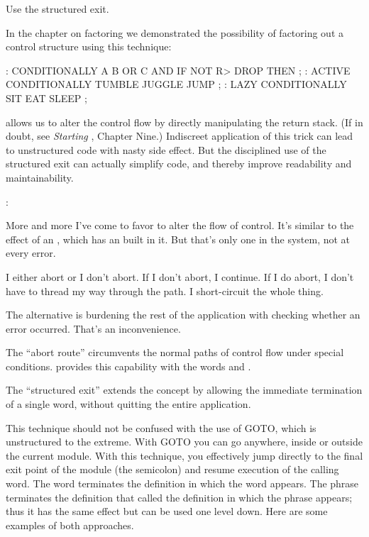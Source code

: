 \begin{tip}
Use the structured exit.
\end{tip}
In the chapter on factoring we demonstrated the possibility of factoring
out a control structure using this technique:

\begin{Code}
: CONDITIONALLY   A B OR  C AND  IF  NOT R> DROP  THEN ;
: ACTIVE   CONDITIONALLY   TUMBLE JUGGLE JUMP ;
: LAZY   CONDITIONALLY  SIT  EAT  SLEEP ;
\end{Code}
\Forth{} allows us to alter the control flow by directly manipulating the
return stack. (If in doubt, see \emph{Starting \Forth{}}, Chapter Nine.)
Indiscreet application of this trick can lead to unstructured code with nasty
side effect. But the disciplined use of the structured exit can actually
simplify code, and thereby improve readability and maintainability.

\begin{interview}
:
\begin{tfquot}
More and more I've come to favor  to alter the flow of
control.  It's similar to the effect of an , which has an
 built in it. But that's only one  in the system, not at every error.

I either abort or I don't abort. If I don't abort, I continue. If I do
abort, I don't have to thread my way through the path. I short-circuit the
whole thing.

The alternative is burdening the rest of the application with checking
whether an error occurred. That's an inconvenience.
\end{tfquot}
\end{interview}
The ``abort route'' circumvents the normal paths of control flow under
special conditions. \Forth{} provides this capability with the words
 and .

The ``structured exit'' extends the concept by allowing the immediate
termination of a single word, without quitting the entire application.

This technique should not be confused with the use of GOTO, which is
unstructured to the extreme. With GOTO you can go anywhere, inside or
outside the current module. With this technique, you effectively jump
directly to the final exit point of the module (the semicolon) and resume
execution of the calling word.
%
The word  terminates the definition in which the word
appears.  The phrase  terminates the definition that
called the definition in which the phrase appears; thus it has the same
effect but can be used one level down. Here are some examples of both
approaches.

